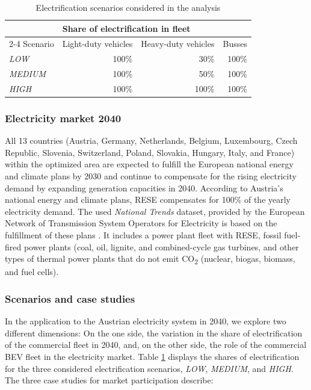 \documentclass[final,10pt]{elsarticle}
\begin{document}
        \begin{table}[]
        \centering
        \caption{Electrification scenarios considered in the analysis}
        \label{tab:parameters_scenario}
        \begin{tabular}{@{}lrrr@{}}
        \toprule
                        & \multicolumn{3}{l}{Share of electrification in fleet} \\ \cmidrule(l){2-4} 
        Scenario & \multicolumn{1}{l}{Light-duty vehicles} & \multicolumn{1}{l}{Heavy-duty vehicles} & \multicolumn{1}{l}{Busses} \\
        \textit{LOW}    & 100\%            & 30\%             & 100\%           \\
        \textit{MEDIUM} & 100\%            & 50\%             & 100\%           \\
        \textit{HIGH}   & 100\%            & 100\%            & 100\%           \\ \bottomrule
        \end{tabular}%
        
        \end{table}
        \subsubsection{Electricity market 2040} 
        All 13 countries (Austria, Germany, Netherlands, Belgium, Luxembourg, Czech Republic, Slovenia, Switzerland, Poland, Slovakia, Hungary, Italy, and France) within the optimized area are expected to fulfill the European national energy and climate plans \cite{NECP2022} by 2030 and continue to compensate for the rising electricity demand by expanding generation capacities in 2040. According to Austria's national energy and climate plans, \ac{RESE} compensates for 100\% of the yearly electricity demand. The used \textit{National Trends} dataset, provided by the European Network of Transmission System Operators for Electricity is based on the fulfillment of these plans \cite{TYNDP2022}. It includes a power plant fleet with \ac{RESE}, fossil fuel-fired power plants (coal, oil, lignite, and combined-cycle gas turbines, and other types of thermal power plants that do not emit CO\textsubscript{2} (nuclear, biogas, biomass, and fuel cells).
        
        \subsubsection{Scenarios and case studies}
            In the application to the Austrian electricity system in 2040, we explore two different dimensions: On the one side, the variation in the share of electrification of the commercial fleet in 2040, and, on the other side, the role of the commercial \ac{BEV} fleet in the electricity market. Table \ref{tab:parameters_scenario} displays the shares of electrification for the three considered electrification scenarios, \textit{LOW}, \textit{MEDIUM}, and \textit{HIGH}. The three case studies for market participation describe:
    
\end{document}
